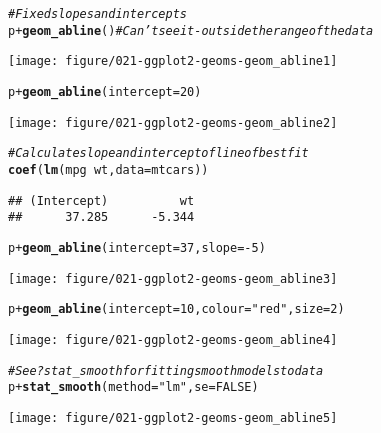 \documentclass[a4paper,titlepage]{tufte-handout}\usepackage[]{graphicx}\usepackage[]{color}
\makeatletter
\def\maxwidth{ %
  \ifdim\Gin@nat@width>\linewidth
    \linewidth
  \else
    \Gin@nat@width
  \fi
}
\newcommand{\hlnum}[1]{\textcolor[rgb]{0.686,0.059,0.569}{#1}}%
\newcommand{\hlstr}[1]{\textcolor[rgb]{0.192,0.494,0.8}{#1}}%
\newcommand{\hlcom}[1]{\textcolor[rgb]{0.678,0.584,0.686}{\textit{#1}}}%
\newcommand{\hlopt}[1]{\textcolor[rgb]{0,0,0}{#1}}%
\newcommand{\hlstd}[1]{\textcolor[rgb]{0.345,0.345,0.345}{#1}}%
\newcommand{\hlkwc}[1]{\textcolor[rgb]{0.333,0.667,0.333}{#1}}%
\newcommand{\hlkwd}[1]{\textcolor[rgb]{0.737,0.353,0.396}{\textbf{#1}}}%
\newenvironment{kframe}{%
 \def\at@end@of@kframe{}%
 \ifinner\ifhmode%
  \def\at@end@of@kframe{\end{minipage}}%
  \begin{minipage}{\columnwidth}%
 \fi\fi%
 \def\FrameCommand##1{\hskip\@totalleftmargin \hskip-\fboxsep
 \colorbox{shadecolor}{##1}\hskip-\fboxsep
     \hskip-\linewidth \hskip-\@totalleftmargin \hskip\columnwidth}%
 \MakeFramed {\advance\hsize-\width
   \@totalleftmargin\z@ \linewidth\hsize
   \@setminipage}}%
 {\par\unskip\endMakeFramed%
 \at@end@of@kframe}
\newenvironment{knitrout}{}{} %
\makeatother
\begin{document}
\begin{knitrout}
\begin{kframe}
\begin{alltt}
\hlcom{# Fixed slopes and intercepts}
\hlstd{p} \hlopt{+} \hlkwd{geom_abline}\hlstd{()} \hlcom{# Can't see it - outside the range of the data}
\end{alltt}
\end{kframe}
\texttt{[image: figure/021-ggplot2-geoms-geom\_abline1]} 
\begin{kframe}\begin{alltt}
\hlstd{p} \hlopt{+} \hlkwd{geom_abline}\hlstd{(}\hlkwc{intercept} \hlstd{=} \hlnum{20}\hlstd{)}
\end{alltt}
\end{kframe}
\texttt{[image: figure/021-ggplot2-geoms-geom\_abline2]} 
\begin{kframe}\begin{alltt}
\hlcom{# Calculate slope and intercept of line of best fit}
\hlkwd{coef}\hlstd{(}\hlkwd{lm}\hlstd{(mpg} \hlopt{~} \hlstd{wt,} \hlkwc{data} \hlstd{= mtcars))}
\end{alltt}
\begin{verbatim}
## (Intercept)          wt 
##      37.285      -5.344
\end{verbatim}
\begin{alltt}
\hlstd{p} \hlopt{+} \hlkwd{geom_abline}\hlstd{(}\hlkwc{intercept} \hlstd{=} \hlnum{37}\hlstd{,} \hlkwc{slope} \hlstd{=} \hlopt{-}\hlnum{5}\hlstd{)}
\end{alltt}
\end{kframe}
\texttt{[image: figure/021-ggplot2-geoms-geom\_abline3]} 
\begin{kframe}\begin{alltt}
\hlstd{p} \hlopt{+} \hlkwd{geom_abline}\hlstd{(}\hlkwc{intercept} \hlstd{=} \hlnum{10}\hlstd{,} \hlkwc{colour} \hlstd{=} \hlstr{"red"}\hlstd{,} \hlkwc{size} \hlstd{=} \hlnum{2}\hlstd{)}
\end{alltt}
\end{kframe}
\texttt{[image: figure/021-ggplot2-geoms-geom\_abline4]} 
\begin{kframe}\begin{alltt}
\hlcom{# See ?stat_smooth for fitting smooth models to data}
\hlstd{p} \hlopt{+} \hlkwd{stat_smooth}\hlstd{(}\hlkwc{method}\hlstd{=}\hlstr{"lm"}\hlstd{,} \hlkwc{se}\hlstd{=}\hlnum{FALSE}\hlstd{)}
\end{alltt}
\end{kframe}
\texttt{[image: figure/021-ggplot2-geoms-geom\_abline5]} 
\begin{kframe}\begin{alltt}

\end{alltt}
\end{kframe}
\end{knitrout}
\end{document}
